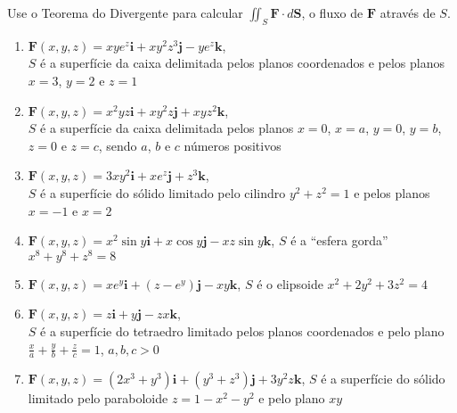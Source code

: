 \documentclass[a4paper, 12pt]{article}
\begin{document}
	
	
	\vspace{5mm}
	
	Use o Teorema do Divergente para calcular $\displaystyle \iint_S \textbf{F} \cdot d\textbf{S}$, o fluxo de $\textbf{F}$ através de $S$.
	
	\begin{enumerate}
		
		\item $\textbf{F}(x,y,z) = xye^z\textbf{i} + xy^{2}z^{3}\textbf{j} - ye^z\textbf{k}$, \\ $S$ é a superfície da caixa delimitada pelos planos coordenados e pelos planos $x = 3$, $y = 2$ e $z = 1$

		\item $\textbf{F}(x,y,z) = x^{2}yz\textbf{i} + xy^{2}z\textbf{j} + xyz^{2}\textbf{k}$, \\ $S$ é a superfície da caixa delimitada pelos planos $x = 0$, $x = a$, $y = 0$, $y = b$, $z = 0$ e $z = c$, sendo $a$, $b$ e $c$ números positivos

		\item $\textbf{F}(x,y,z) = 3xy^2\textbf{i} + xe^z\textbf{j} + z^3\textbf{k}$, \\ $S$ é a superfície do sólido limitado pelo cilindro $y^2 + z^2 = 1$ e pelos planos $x = -1$ e $x = 2$

		\item $\textbf{F}(x,y,z) = x^{2}\sin y\textbf{i} + x\cos y\textbf{j} - xz\sin y\textbf{k}$, \; $S$ é a ``esfera gorda'' $x^8 + y^8 + z^8 = 8$\\
		\resposta{\fazer}

		\item $\textbf{F}(x,y,z) = xe^y\textbf{i} + (z - e^y)\textbf{j} - xy\textbf{k}$, \; $S$ é o elipsoide $x^2 + 2y^2 + 3z^2 = 4$

		\item $\textbf{F}(x,y,z) = z\textbf{i} + y\textbf{j} - zx\textbf{k}$, \\ $S$ é a superfície do tetraedro limitado pelos planos coordenados e pelo plano $\displaystyle \frac{x}{a} + \frac{y}{b} + \frac{z}{c} = 1$, \; $a,b,c > 0$

		\item $\textbf{F}(x,y,z) = (2x^3 + y^3)\textbf{i} + (y^3 + z^3)\textbf{j} + 3y^{2}z\textbf{k}$, \; $S$ é a superfície do sólido limitado pelo paraboloide $z = 1 - x^2 - y^2$ e pelo plano $xy$
		\resposta{$\pi$}


\end{enumerate}
\end{document}
